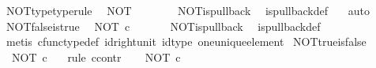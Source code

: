 \begin{isabellebody}
\isanewline
{}\isamarkupfalse%
\ NOT{\isacharunderscore}{\kern0pt}type{\isacharbrackleft}{\kern0pt}type{\isacharunderscore}{\kern0pt}rule{\isacharbrackright}{\kern0pt}{\isacharcolon}{\kern0pt}\isanewline
\ \ {\isachardoublequoteopen}NOT\ {\isacharcolon}{\kern0pt}\ {\isasymOmega}\ {\isasymrightarrow}\ {\isasymOmega}{\isachardoublequoteclose}\isanewline
%
\isadelimproof
\ \ %
\endisadelimproof
%
\isatagproof
{}\isamarkupfalse%
\ NOT{\isacharunderscore}{\kern0pt}is{\isacharunderscore}{\kern0pt}pullback\ \isamarkupfalse%
\ is{\isacharunderscore}{\kern0pt}pullback{\isacharunderscore}{\kern0pt}def\ \ \isamarkupfalse%
\ auto%
\endisatagproof
{\isafoldproof}%
%
\isadelimproof
\isanewline
%
\endisadelimproof
\isanewline
{}\isamarkupfalse%
\ NOT{\isacharunderscore}{\kern0pt}false{\isacharunderscore}{\kern0pt}is{\isacharunderscore}{\kern0pt}true{\isacharcolon}{\kern0pt}\isanewline
\ \ {\isachardoublequoteopen}NOT\ {\isasymcirc}\isactrlsub c\ {\isasymf}\ {\isacharequal}{\kern0pt}\ {\isasymt}{\isachardoublequoteclose}\isanewline
%
\isadelimproof
\ \ %
\endisadelimproof
%
\isatagproof
{}\isamarkupfalse%
\ NOT{\isacharunderscore}{\kern0pt}is{\isacharunderscore}{\kern0pt}pullback\ \isamarkupfalse%
\ is{\isacharunderscore}{\kern0pt}pullback{\isacharunderscore}{\kern0pt}def\ \isanewline
\ \ \isamarkupfalse%
\ {\isacharparenleft}{\kern0pt}metis\ cfunc{\isacharunderscore}{\kern0pt}type{\isacharunderscore}{\kern0pt}def\ id{\isacharunderscore}{\kern0pt}right{\isacharunderscore}{\kern0pt}unit\ id{\isacharunderscore}{\kern0pt}type\ one{\isacharunderscore}{\kern0pt}unique{\isacharunderscore}{\kern0pt}element{\isacharparenright}{\kern0pt}%
\endisatagproof
{\isafoldproof}%
%
\isadelimproof
\isanewline
%
\endisadelimproof
\isanewline
{}\isamarkupfalse%
\ NOT{\isacharunderscore}{\kern0pt}true{\isacharunderscore}{\kern0pt}is{\isacharunderscore}{\kern0pt}false{\isacharcolon}{\kern0pt}\isanewline
\ \ {\isachardoublequoteopen}NOT\ {\isasymcirc}\isactrlsub c\ {\isasymt}\ {\isacharequal}{\kern0pt}\ {\isasymf}{\isachardoublequoteclose}\isanewline
%
\isadelimproof
%
\endisadelimproof
%
\isatagproof
{}\isamarkupfalse%
{\isacharparenleft}{\kern0pt}rule\ ccontr{\isacharparenright}{\kern0pt}\isanewline
\ \ \isamarkupfalse%
\ {\isachardoublequoteopen}NOT\ {\isasymcirc}\isactrlsub c\ {\isasymt}\ {\isasymnoteq}\ {\isasymf}{\isachardoublequoteclose}\isanewline
\ \ \isamarkupfalse%
\ \isamarkupfalse%

\end{isabellebody}
